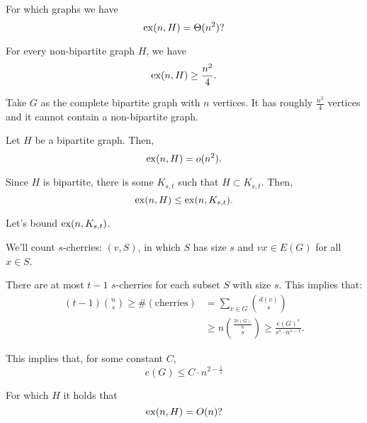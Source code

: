 \begin{ques}
	For which graphs we have \[
		\operatorname{ex}(n, H) = \Theta(n^2)?
	\]
\end{ques}

\begin{prop}
	For every non-bipartite graph $H$, we have \[
		\operatorname{ex}(n, H) \ge \frac{n^2}{4}.
	\]
\end{prop}

\begin{dem}
	Take $G$ as the complete bipartite graph with $n$ vertices. It has roughly $\frac{n^2}{4}$ vertices and it cannot contain a non-bipartite graph.
\end{dem}

\begin{thm}
	Let $H$ be a bipartite graph. Then, \[
		\operatorname{ex}(n, H) = o(n^2).
	\]
\end{thm}

\begin{dem}
	Since $H$ is bipartite, there is some $K_{s,t}$ such that $H \subset K_{s, t}$. Then, \[
		\operatorname{ex}(n, H) \le \operatorname{ex}(n, K_{s, t}).
	\]

	Let's bound $\operatorname{ex}(n, K_{s, t})$.

	We'll count $s$-cherries: $(v, S)$, in which $S$ has size $s$ and $vx \in E(G)$ for all $x \in S$.


	There are at most $t-1$ $s$-cherries for each subset $S$ with size $s$. This implies that:
	 \begin{align*}
		 (t-1)\binom{n}{s} \ge \#(\text{cherries}) &= \sum_{v \in G} \binom{d(v)}{s}\\
			&\ge n\binom{\frac{2e(G)}{n}}{s} \ge \frac{e(G)^s}{s^s\cdot n^{s-1}}.
	\end{align*}

	This implies that, for some constant $C$, \[
		e(G) \le C \cdot n^{2 - \frac{1}{s}}
	\]

\end{dem}

\begin{ques}
	For which $H$ it holds that \[
		\operatorname{ex}(n, H) = O(n)?
	\]
\end{ques}
